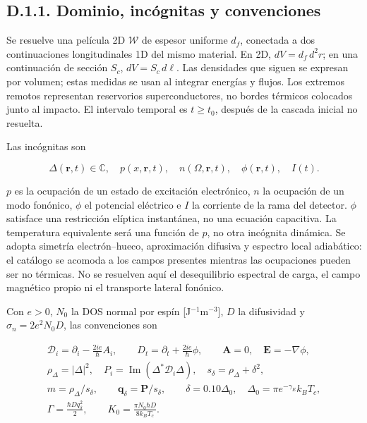 \documentclass[
  spanish,
  10pt,
  a4paper,
]{article}
\begin{document}
\subsection{D.1.1. Dominio, incógnitas y
convenciones}\label{d.1.1.-dominio-incuxf3gnitas-y-convenciones}

Se resuelve una película 2D \(\mathcal W\) de espesor uniforme \(d_f\),
conectada a dos continuaciones longitudinales 1D del mismo material. En
2D, \(dV=d_f\,d^2r\); en una continuación de sección \(S_c\),
\(dV=S_c\,d\ell\). Las densidades que siguen se expresan por volumen;
estas medidas se usan al integrar energías y flujos. Los extremos
remotos representan reservorios superconductores, no bordes térmicos
colocados junto al impacto. El intervalo temporal es \(t\geq t_0\),
después de la cascada inicial no resuelta.

Las incógnitas son

\[
\Delta(\mathbf r,t)\in\mathbb C,\quad p(x,\mathbf r,t),\quad
n(\Omega,\mathbf r,t),\quad \phi(\mathbf r,t),\quad I(t).
\tag{D.1}
\]

\(p\) es la ocupación de un estado de excitación electrónico, \(n\) la
ocupación de un modo fonónico, \(\phi\) el potencial eléctrico e \(I\)
la corriente de la rama del detector. \(\phi\) satisface una restricción
elíptica instantánea, no una ecuación capacitiva. La temperatura
equivalente será una función de \(p\), no otra incógnita dinámica. Se
adopta simetría electrón--hueco, aproximación difusiva y espectro local
adiabático: el catálogo se acomoda a los campos presentes mientras las
ocupaciones pueden ser no térmicas. No se resuelven aquí el
desequilibrio espectral de carga, el campo magnético propio ni el
transporte lateral fonónico.

Con \(e>0\), \(N_0\) la DOS normal por espín {[}J\(^{-1}\)m\(^{-3}\){]},
\(D\) la difusividad y \(\sigma_n=2e^2N_0D\), las convenciones son

\[
\begin{gathered}
\mathcal D_i=\partial_i-\frac{2ie}{\hbar}A_i,\qquad
D_t=\partial_t+\frac{2ie}{\hbar}\phi,\qquad
\mathbf A=0,\quad\mathbf E=-\nabla\phi,\\
\rho_\Delta=|\Delta|^2,\quad P_i=\operatorname{Im}(\Delta^*\mathcal D_i\Delta),\quad
s_\delta=\rho_\Delta+\delta^2,\\
m=\rho_\Delta/s_\delta,\qquad \mathbf q_\delta=\mathbf P/s_\delta,\qquad
\delta=0.10\Delta_0,\quad \Delta_0=\pi e^{-\gamma_E}k_BT_c,\\
\Gamma=\frac{\hbar Dq_\delta^2}{2},\qquad
K_0=\frac{\pi N_0\hbar D}{8k_BT_c}.
\end{gathered}\tag{D.2}
\]
\end{document}
